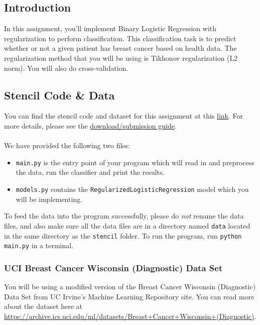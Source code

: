 \documentclass{article}
\begin{document}
\subsection*{Introduction}
In this assignment, you'll implement Binary Logistic Regression with regularization to perform classification. This classification task is to predict whether or not a given patient has breast cancer based on health data. The regularization method that you will be using is Tikhonov regularization (L2 norm). You will also do cross-validation.

\subsection*{Stencil Code \& Data}

You can find the stencil code and dataset for this assignment at this \href{https://drive.google.com/drive/folders/14aCaFkZPvYvyj97DIy5crodD1L6NRZwK?usp=sharing}{link}. For more details, please see the  \href{https://docs.google.com/document/d/1dYim__KVuE9nZj7RBWr9Mw-S6w6EjeFBbSBDxWWWJFA/edit?usp=sharing}{download/submission guide}.
\\ \\
We have provided the following two files:
\begin{itemize}
	\item \texttt{main.py} is the entry point of your program which will read in and preprocess the data, run the classifier and print the results.
	\item \texttt{models.py} contains the \texttt{RegularizedLogisticRegression} model which you will be implementing.
\end{itemize}
To feed the data into the program successfully, please do \textit{not} rename the data files, and also make sure all the data files are in a directory named \texttt{data} located in the same directory as the \texttt{stencil} folder. To run the program, run \texttt{python main.py} in a terminal.

\subsubsection*{UCI Breast Cancer Wisconsin (Diagnostic) Data Set}
You will be using a modified version of the Breast Cancer Wisconsin (Diagnostic) Data Set from UC Irvine's Machine Learning Repository site. You can read more about the dataset here at\\ \url{https://archive.ics.uci.edu/ml/datasets/Breast+Cancer+Wisconsin+(Diagnostic)}. 
\end{document}
